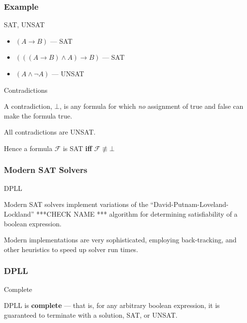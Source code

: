 \documentclass{beamer}
\begin{document}
\begin{frame}
\frametitle{Example}
\begin{exampleblock}
{SAT, UNSAT} 

\begin{itemize}
\item \((A \rightarrow B)\) --- SAT
\item \((((A \rightarrow B) \land A) \rightarrow B)\) --- SAT
\item \((A \land \neg A)\) --- UNSAT
\end{itemize}
\end{exampleblock}

\begin{alertblock}
{Contradictions}

A contradiction, \(\bot\), is any formula for which \emph{no} assignment of true and false can make the formula true.

All contradictions are UNSAT.  

Hence a formula \(\mathcal{F}\) is SAT \textbf{iff} \(\mathcal{F} \not \equiv \bot\) 
\end{alertblock}

\end{frame}

\begin{frame}
\frametitle{Modern SAT Solvers}
\begin{block}
{DPLL} 

Modern SAT solvers implement variations of the ``David-Putnam-Loveland-Lockland'' ***CHECK NAME *** algorithm for determining satisfiability of a boolean expression.

Modern implementations are very sophisticated, employing back-tracking, and other heuristics to speed up solver run times.

\end{block}
\end{frame}

\begin{frame}
\frametitle{DPLL}
\begin{alertblock}
{Complete} 

DPLL is \textbf{complete} --- that is, for any arbitrary boolean expression, it is guaranteed to terminate with a solution, SAT, or UNSAT.

\end{alertblock}
\end{frame}
\end{document}
